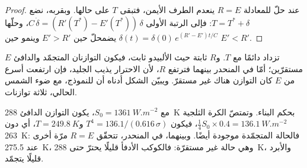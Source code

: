 \begin{proof}
عند حلّ للمعادلة $R = E$ ينعدم الطرف الأيمن، فتبقى $T$ على حالها. وبقربه، نضع $T = T^*
+ \delta$: فإلى الرتبة الأولى $C\,\dot\delta = (R'(T^*) - E'(T^*))\,\delta$، وحلّها
$\delta(t) = \delta(0)\,e^{(R' - E')t/C}$ يضمحلّ حين $E' > R'$ وينمو حين $E' < R'$.
\end{proof}

$E$ تزداد دائمًا مع $T$. و$R$ ثابتة حيث الألبيدو ثابت، فيكون التوازنان المتجمّد والدافئ
مستقرّين؛ أمّا في المنحدر بينهما فترتفع $R$، لأن الاحترار يذيب الجليد، فإن
ارتفعت أسرع من $E$ كان التوازن هناك غير مستقرّ. ويبيّن الشكل أدناه أن للنموذج، مع ضوء الشمس
الحالي، ثلاثة توازنات.

\begin{example}\label{ex:b2:precambrian-earth:three}
مع $S_0 = \qty{1361}{W.m^{-2}}$، يكون التوازن الدافئ \qty{288}{K} بحكم البناء. وتمتصّ
الكرة الثلجية $\tfrac14 S_0\times0.4 = \qty{136.1}{W.m^{-2}}$، فيكون $T^4 =
136.1/(0.616\,\sigma)$ و$T = \qty{249.8}{K}$، أي دون \qty{263}{K}: فالحالة المتجمّدة
موجودة أيضًا. وبينهما، في المنحدر، تتحقّق $R = E$ مرّة أخرى عند \qty{275.5}{K}، وهي حالة غير مستقرّة: فالكوكب
الأدفأ قليلًا يحترّ حتى \qty{288}{K}، والأبرد قليلًا يتجمّد.
\end{example}

